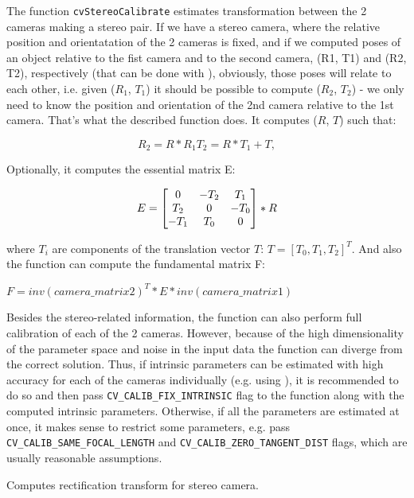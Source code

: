 The function \texttt{cvStereoCalibrate} estimates transformation between the 2 cameras making a stereo pair. If we have a stereo camera, where the relative position and orientatation of the 2 cameras is fixed, and if we computed poses of an object relative to the fist camera and to the second camera, (R1, T1) and (R2, T2), respectively (that can be done with ), obviously, those poses will relate to each other, i.e. given ($R_1$, $T_1$) it should be possible to compute ($R_2$, $T_2$) - we only need to know the position and orientation of the 2nd camera relative to the 1st camera. That's what the described function does. It computes ($R$, $T$) such that:

\[
R_2=R*R_1
T_2=R*T_1 + T,
\]

Optionally, it computes the essential matrix E:

\[
E=
\begin{bmatrix} 0 & -T_2 & T_1\\ T_2 & 0 & -T_0\\ -T_1 & T_0 & 0 \end{bmatrix}
*R
\]

where $T_i$ are components of the translation vector $T$: $T=[T_0, T_1, T_2]^T$. And also the function can compute the fundamental matrix F:

$F = inv(camera\_matrix2)^T*E*inv(camera\_matrix1)$

Besides the stereo-related information, the function can also perform full calibration of each of the 2 cameras. However, because of the high dimensionality of the parameter space and noise in the input data the function can diverge from the correct solution. Thus, if intrinsic parameters can be estimated with high accuracy for each of the cameras individually (e.g. using ), it is recommended to do so and then pass \texttt{CV\_CALIB\_FIX\_INTRINSIC} flag to the function along with the computed intrinsic parameters. Otherwise, if all the parameters are estimated at once, it makes sense to restrict some parameters, e.g. pass \texttt{CV\_CALIB\_SAME\_FOCAL\_LENGTH} and \texttt{CV\_CALIB\_ZERO\_TANGENT\_DIST} flags, which are usually reasonable assumptions. 


Computes rectification transform for stereo camera.

